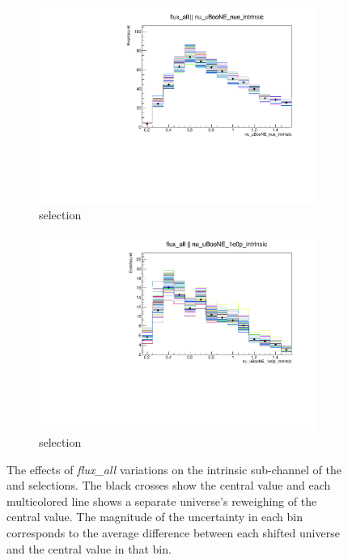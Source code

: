 \begin{figure}[H] 
    \centering
    \begin{subfigure}[b]{0.45\textwidth}
    \centering
    \includegraphics[width=1.00\textwidth]{Systematics/systvariations/BDT/Variation_nue_1e0p_numu_reco_e_H1_mc_collab_flux_all_nu_uBooNE_nue_intrinsic_1D.pdf}
    \caption{\npsel selection}
    \end{subfigure}
    \begin{subfigure}[b]{0.45\textwidth}
    \includegraphics[width=1.00\textwidth]{Systematics/systvariations/BDT/Variation_nue_1e0p_numu_reco_e_H1_mc_collab_flux_all_nu_uBooNE_1e0p_intrinsic_1D.pdf}
    \caption{\zpsel selection}
    \end{subfigure}
\caption{\label{fig:fluxsystvars} The effects of \textit{flux\_all} variations on the intrinsic \nue sub-channel of the \npsel and \zpsel selections. The black crosses show the central value and each multicolored line shows a separate universe's reweighing of the central value. The magnitude of the  uncertainty in each bin corresponds to the average difference between each shifted universe and the central value in that bin.}
\end{figure}

